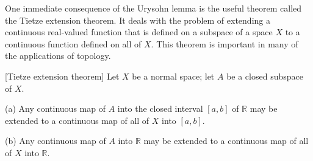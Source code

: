 One immediate consequence of the Urysohn lemma is the useful theorem called the Tietze extension theorem. It deals with the problem of extending a continuous real-valued function that is defined on a subspace of a space \(X\) to a continuous function defined on all of \(X\). This theorem is important in many of the applications of topology.

\begin{theorem}
\label{thm:\thetheorem}[Tietze extension theorem]
 Let \(X\) be a normal space; let \(A\) be a closed subspace of \(X\).

(a) Any continuous map of \(A\) into the closed interval \([ {a,b}]\) of \(\mathbb{R}\) may be extended to a continuous map of all of \(X\) into \([ {a,b}]\).

(b) Any continuous map of \(A\) into \(\mathbb{R}\) may be extended to a continuous map of all of \(X\) into \(\mathbb{R}\).

\end{theorem}
